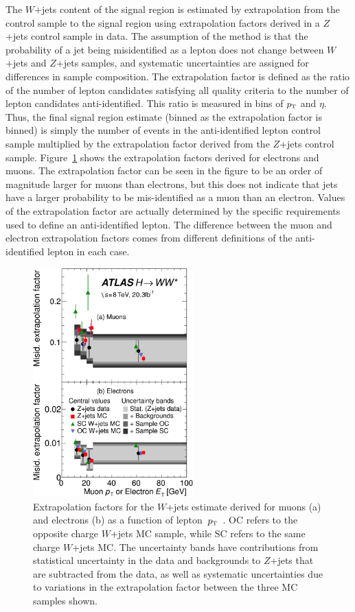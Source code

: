 The $W$+jets content of the signal region is estimated by extrapolation from the control sample to the signal region using extrapolation factors derived in a $Z$+jets control sample in data. The assumption of the method is that the probability of a jet being misidentified as a lepton does not change between $W$+jets and $Z$+jets samples, and systematic uncertainties are assigned for differences in sample composition. The extrapolation factor is defined as the ratio of the number of lepton candidates satisfying all quality criteria to the number of lepton candidates anti-identified. This ratio is measured in bins of $p_{\textrm{\footnotesize\sc t}}$ and $\eta$. Thus, the final signal region estimate (binned as the extrapolation factor is binned) is simply the number of events in the anti-identified lepton control sample multiplied by the extrapolation factor derived from the $Z$+jets control sample. Figure~\ref{fig:VBF_extrap_Wjets} shows the extrapolation factors derived for electrons and muons.  The extrapolation factor can be seen in the figure to be an order of magnitude larger for muons than electrons, but this does not indicate that jets have a larger probability to be mis-identified as a muon than an electron. Values of the extrapolation factor are actually determined by the specific requirements used to define an anti-identified lepton. The difference between the muon and electron extrapolation factors comes from different definitions of the anti-identified lepton in each case.

\begin{figure}[h!]
  \centering
  \captionsetup{justification=centering}
  \includegraphics[width=0.55\textwidth]{figures/VBF_Wjets_extrap}
  \caption{Extrapolation factors for the $W$+jets estimate derived for muons (a) and electrons (b) as a function of lepton~$p_{\textrm{\footnotesize\sc t}}$~\cite{WW2015}. OC refers to the opposite charge $W$+jets MC sample, while SC refers to the same charge $W$+jets MC. The uncertainty bands have contributions from statistical uncertainty in the data and backgrounds to $Z$+jets that are subtracted from the data, as well as systematic uncertainties due to variations in the extrapolation factor between the three MC samples shown.}
  \label{fig:VBF_extrap_Wjets}
\end{figure}


